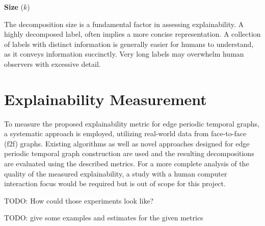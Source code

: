 \textbf{Size} ($k$)

The decomposition size is a fundamental factor in assessing explainability. A highly decomposed label, often implies a more concise representation. A collection of labels with distinct information is generally easier for humans to understand, as it conveys information succinctly. Very long labels may overwhelm human observers with excessive detail.


\section{Explainability Measurement}

To measure the proposed explainability metric for edge periodic temporal graphs, a systematic approach is employed, utilizing real-world data from face-to-face (f2f) graphs. Existing algorithms as well as novel approaches designed for edge periodic temporal graph construction are used and the resulting decompositions are evaluated using the described metrics. For a more complete analysis of the quality of the measured explainability, a study with a human computer interaction focus would be required but is out of scope for this project.

TODO: How could those experiments look like?

TODO: give some examples and estimates for the given metrics